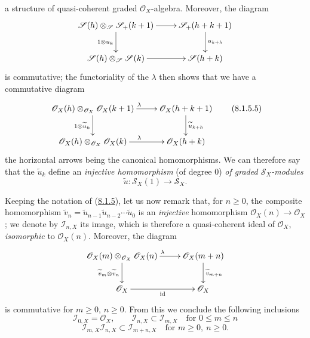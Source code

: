 \begin{env}[8.1.5]
a structure of quasi-coherent graded $\mathcal{O}_X$-algebra. Moreover, the
diagram
\[
\xymatrix{
  \mathcal{S}(h)\otimes_{\mathcal{S}}\mathcal{S}_+(k+1)\ar[r]\ar[d]_{1\otimes u_k}
  & \mathcal{S}_+(h+k+1)\ar[d]^{u_{k+h}}\\
  \mathcal{S}(h)\otimes_{\mathcal{S}}\mathcal{S}(k)\ar[r]
  & \mathcal{S}(h+k)
}
\]
is commutative; the functoriality of the $\lambda$ then shows that we have a
commutative diagram
\begin{equation}
\label{II.8.1.5.5}
\xymatrix{
  \mathcal{O}_X(h)\otimes_{\mathcal{O}_X}\mathcal{O}_X(k+1)
    \ar[r]^{\lambda}\ar[d]_{1\otimes\widetilde{u}_k}
  & \mathcal{O}_X(h+k+1)\ar[d]^{\widetilde{u}_{k+h}}\\
  \mathcal{O}_X(h)\otimes_{\mathcal{O}_X}\mathcal{O}_X(k)
    \ar[r]^{\lambda}
  & \mathcal{O}_X(h+k)
}
\tag{8.1.5.5}
\end{equation}
the horizontal arrows being the canonical homomorphisms. We can therefore
say that the $\widetilde{u}_k$ define an \emph{injective homomorphism} (of
degree $0$) \emph{of graded $\mathcal{S}_X$-modules}
\begin{equation}
\label{II.8.1.5.6}
  \widetilde{u}:\mathcal{S}_X(1)\to\mathcal{S}_X.
\tag{8.1.5.6}
\end{equation}
\end{env}

\begin{env}[8.1.6]
\label{II.8.1.6}
Keeping the notation of (\hyperref[II.8.1.5]{8.1.5}), let us now remark
that, for $n\geq0$, the composite homomorphism
$\widetilde{v}_n=\widetilde{u}_{n-1}\widetilde{u}_{n-2}\cdots\widetilde{u}_0$
is an \emph{injective} homomorphism $\mathcal{O}_X(n)\to\mathcal{O}_X$;
we denote by $\mathcal{I}_{n,X}$ its image, which is therefore a
quasi-coherent ideal of $\mathcal{O}_X$, \emph{isomorphic} to $\mathcal{O}_X(n)$.
Moreover, the diagram
\[
\xymatrix{
  \mathcal{O}_X(m)\otimes_{\mathcal{O}_X}\mathcal{O}_X(n)
    \ar[r]^{\lambda}\ar[d]_{\widetilde{v}_m\otimes\widetilde{v}_n}
  & \mathcal{O}_X(m+n)\ar[d]^{\widetilde{v}_{m+n}}\\
  \mathcal{O}_X\ar[r]_{\mathrm{id}}
  & \mathcal{O}_X
}
\]
is commutative for $m\geq0$, $n\geq0$. From this we conclude the following
inclusions
\begin{equation}
\label{II.8.1.6.1}
  \mathcal{I}_{0,X}=\mathcal{O}_X,\qquad
  \mathcal{I}_{n,X}\subset\mathcal{I}_{m,X}
  \quad\text{for }0\leq m\leq n
\tag{8.1.6.1}
\end{equation}
\begin{equation}
\label{II.8.1.6.2}
  \mathcal{I}_{m,X}\mathcal{I}_{n,X}\subset\mathcal{I}_{m+n,X}
  \quad\text{for }m\geq0,\ n\geq0.
\tag{8.1.6.2}
\end{equation}
\end{env}

